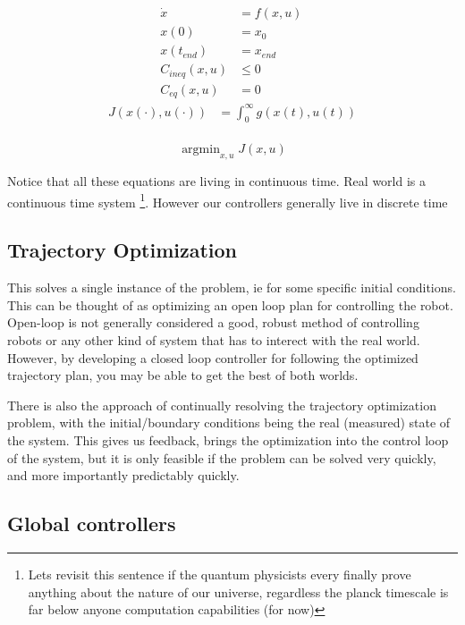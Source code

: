 \documentclass[a4paper, 10pt, twocolumn]{article}
\DeclareMathOperator*{\argmin}{argmin}
\begin{document}
\begin{align*}
    \dot{x}        & = f(x, u)\, \\
    x(0)           & = x_0       \\
    x(t_{end})\,    & = x_{end}\, \\
    C_{ineq}(x, u) & \leq 0      \\
    C_{eq}(x, u)   & = 0
\end{align*}
\begin{align*}
    J(x(\cdot), u(\cdot)) & = \int_{0}^{\infty } g(x(t), u(t)) \\
\end{align*}

\begin{equation}
    \argmin_{x, u} J(x, u)
\end{equation}

Notice that all these equations are living in continuous time. Real world is a continuous time system \footnote{Lets revisit this sentence if the quantum physicists every finally prove anything about the nature of our universe, regardless the planck timescale is far below anyone computation capabilities (for now)}. However our controllers generally live in discrete time

\subsection{Trajectory Optimization}

This solves a single instance of the problem, ie for some specific initial conditions. This can be thought of as optimizing an open loop plan for controlling the robot. Open-loop is not generally considered a good, robust method of controlling robots or any other kind of system that has to interect with the real world. However, by developing a closed loop controller for following the optimized trajectory plan, you may be able to get the best of both worlds.

There is also the approach of continually resolving the trajectory optimization problem, with the initial/boundary conditions being the real (measured) state of the system. This gives us feedback, brings the optimization into the control loop of the system, but it is only feasible if the problem can be solved very quickly, and more importantly predictably quickly.

\subsection{Global controllers}
\end{document}
